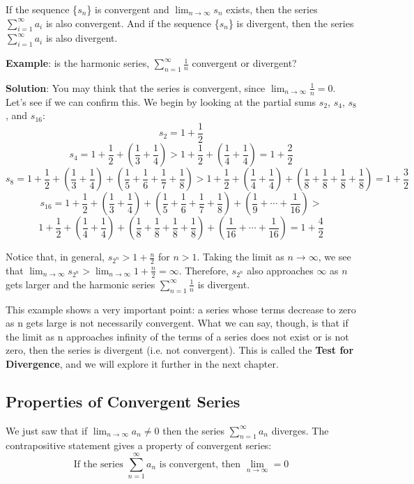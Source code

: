 If the sequence \{$s_n$\} is convergent and $\lim_{n \to \infty} s_n$ 
exists, then the series $\sum_{i=1}^\infty a_i$ is also convergent. 
And if the sequence \{$s_n$\} is divergent, then the series 
$\sum_{i=1}^\infty a_i$ is also divergent.

\textbf{Example}: is the harmonic series, $\sum_{n = 1}^\infty \frac{1}{n}$ 
convergent or divergent?

\textbf{Solution}: You may think that the series is convergent, since $\lim_
{n \to \infty} \frac{1}{n} = 0$. Let's see if we can confirm this. We begin by 
looking at the partial sums $s_2$, $s_4$, $s_8$, and $s_16$:
$$s_2 = 1 + \frac{1}{2}$$
$$s_4 = 1 + \frac{1}{2} + \left(\frac{1}{3} + \frac{1}{4} \right) > 1 + 
\frac{1}{2} + \left( \frac{1}{4} + \frac{1}{4} \right) = 1 + \frac{2}{2}$$
$$s_8 = 1 + \frac{1}{2} + \left(\frac{1}{3} + \frac{1}{4} \right) + \left( 
\frac{1}{5} + \frac{1}{6} + \frac{1}{7} + \frac{1}{8} \right) > 1 + \frac{1}{2} 
+ \left(\frac{1}{4} + \frac{1}{4} \right) + \left( \frac{1}{8} + \frac{1}{8} + 
\frac{1}{8} + \frac{1}{8} \right) = 1 + \frac{3}{2}$$
$$s_{16} = 1 + \frac{1}{2} + \left(\frac{1}{3} + \frac{1}{4} \right) + \left( 
\frac{1}{5} + \frac{1}{6} + \frac{1}{7} + \frac{1}{8} \right) + \left(
\frac{1}{9} + \cdots + \frac{1}{16} \right) > $$
$$1 + \frac{1}{2} + \left(\frac{1}{4} + \frac{1}{4} \right) + \left( 
\frac{1}{8} + \frac{1}{8} + \frac{1}{8} + \frac{1}{8} \right) + \left(
\frac{1}{16} + \cdots + \frac{1}{16} \right) = 1 + \frac{4}{2}$$

Notice that, in general, $s_{2^n} > 1 + \frac{n}{2}$ for $n > 1$. Taking the 
limit as $n \to \infty$, we see that $\lim_{n \to \infty} s_{2^n} > \lim_{n 
\to \infty} 1 + \frac{n}{2} = \infty$. Therefore, $s_{2^n}$ also approaches 
$\infty$ as $n$ gets larger and the harmonic series $\sum_{n = 1}^\infty 
\frac{1}{n}$ is divergent. 

This example shows a very important point: a series whose terms decrease to 
zero as n gets large is not necessarily convergent. What we can say, though, 
is that if the limit as n approaches infinity of the terms of a series does not 
exist or is not zero, then the series is divergent (i.e. not convergent). This 
is called the \textbf{Test for Divergence}, and we will explore it further in 
the next chapter.

\subsection{Properties of Convergent Series}
We just saw that if $\lim_{n \to \infty} a_n \neq 0$ then the series $\sum_
{n=1}^\infty a_n$ diverges. The contrapositive statement gives a property of 
convergent series:
$$\text{If the series } \sum_{n=1}^\infty a_n \text{ is convergent, then } 
\lim_{n \to \infty} = 0$$

